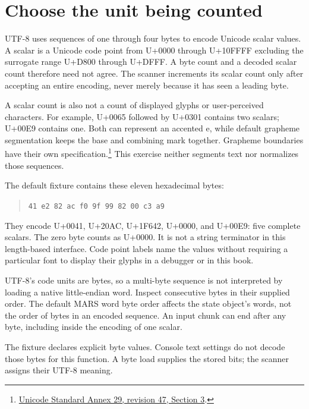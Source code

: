 \section{Choose the unit being counted}
UTF-8 uses sequences of one through four bytes to encode Unicode scalar values.
A scalar is a Unicode code point from U+0000 through U+10FFFF excluding the surrogate
range U+D800 through U+DFFF. A byte count and a decoded scalar count therefore need
not agree. The scanner increments its scalar count only after accepting an entire
encoding, never merely because it has seen a leading byte.

A scalar count is also not a count of displayed glyphs or user-perceived characters.
For example, U+0065 followed by U+0301 contains two scalars; U+00E9 contains one.
Both can represent an accented e, while default grapheme segmentation keeps the base
and combining mark together. Grapheme boundaries have their own specification.\footnote{\href{https://www.unicode.org/reports/tr29/tr29-47.html}{Unicode Standard Annex 29, revision 47, Section 3}.}
This exercise neither segments text nor normalizes those sequences.

The default fixture contains these eleven hexadecimal bytes:
\begin{quote}\texttt{41 e2 82 ac f0 9f 99 82 00 c3 a9}\end{quote}
They encode U+0041, U+20AC, U+1F642, U+0000, and U+00E9: five complete scalars.
The zero byte counts as U+0000. It is not a string terminator in this length-based
interface. Code point labels name the values without requiring a particular font
to display their glyphs in a debugger or in this book.

UTF-8's code units are bytes, so a multi-byte sequence is not interpreted by loading
a native little-endian word. Inspect consecutive bytes in their supplied order.
The default MARS word byte order affects the state object's words, not the order
of bytes in an encoded sequence. An input chunk can end after any byte, including
inside the encoding of one scalar.

The fixture declares explicit byte values. Console text settings do not decode
those bytes for this function. A byte load supplies the stored bits; the scanner
assigns their UTF-8 meaning.
